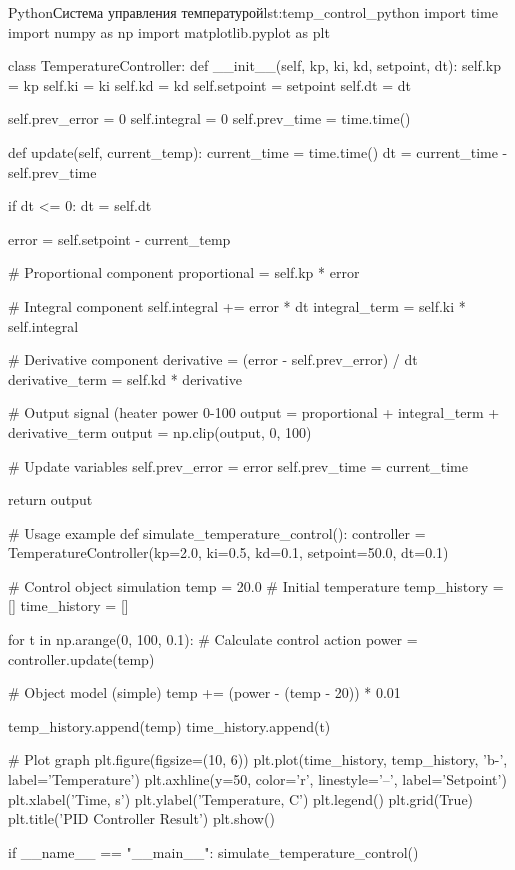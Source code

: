\begin{CodeBlock}{Python}{Система управления температурой}{lst:temp_control_python}
import time
import numpy as np
import matplotlib.pyplot as plt

class TemperatureController:
    def __init__(self, kp, ki, kd, setpoint, dt):
        self.kp = kp
        self.ki = ki  
        self.kd = kd
        self.setpoint = setpoint
        self.dt = dt
        
        self.prev_error = 0
        self.integral = 0
        self.prev_time = time.time()
        
    def update(self, current_temp):
        current_time = time.time()
        dt = current_time - self.prev_time
        
        if dt <= 0:
            dt = self.dt
            
        error = self.setpoint - current_temp
        
        # Proportional component
        proportional = self.kp * error
        
        # Integral component
        self.integral += error * dt
        integral_term = self.ki * self.integral
        
        # Derivative component
        derivative = (error - self.prev_error) / dt
        derivative_term = self.kd * derivative
        
        # Output signal (heater power 0-100%
        output = proportional + integral_term + derivative_term
        output = np.clip(output, 0, 100)
        
        # Update variables
        self.prev_error = error
        self.prev_time = current_time
        
        return output

# Usage example
def simulate_temperature_control():
    controller = TemperatureController(kp=2.0, ki=0.5, kd=0.1, 
                                     setpoint=50.0, dt=0.1)
    
    # Control object simulation
    temp = 20.0  # Initial temperature
    temp_history = []
    time_history = []
    
    for t in np.arange(0, 100, 0.1):
        # Calculate control action
        power = controller.update(temp)
        
        # Object model (simple)
        temp += (power - (temp - 20)) * 0.01
        
        temp_history.append(temp)
        time_history.append(t)
    
    # Plot graph
    plt.figure(figsize=(10, 6))
    plt.plot(time_history, temp_history, 'b-', label='Temperature')
    plt.axhline(y=50, color='r', linestyle='--', label='Setpoint')
    plt.xlabel('Time, s')
    plt.ylabel('Temperature, C')
    plt.legend()
    plt.grid(True)
    plt.title('PID Controller Result')
    plt.show()

if __name__ == "__main__":
    simulate_temperature_control()
\end{CodeBlock}
